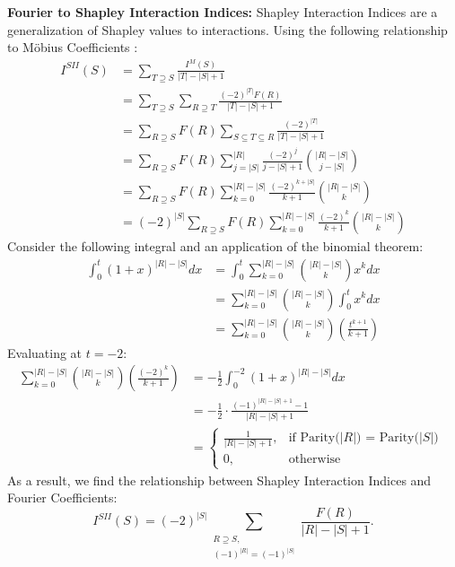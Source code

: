 \textbf{Fourier to Shapley Interaction Indices:}
Shapley Interaction Indices \cite{GRABISCH1997167} are a generalization of Shapley values to interactions. Using the following relationship to M\"obius Coefficients \cite{grabisch2000equivalent}:
\begin{align}
    I^{SII}(S) &= \sum_{T \supseteq S} \frac{I^M(S)}{|T|-|S| + 1}\\
    &= \sum_{T \supseteq S} \sum_{R \supseteq T}\frac{(-2)^{|T|}F(R)}{|T|-|S| + 1}\\
    &= \sum_{R \supseteq S} F(R)\sum_{S \subseteq T \subseteq R}\frac{(-2)^{|T|}}{|T|-|S| + 1}\\
    &= \sum_{R \supseteq S} F(R)\sum_{j = |S|}^{|R|}\frac{(-2)^{j}}{j-|S| + 1 }\binom{|R| - |S|}{j - |S|}\\
    &= \sum_{R \supseteq S} F(R)\sum_{k=0}^{|R|-|S|}\frac{(-2)^{k+|S|}}{k + 1}\binom{|R| - |S|}{k}\\
    &= (-2)^{|S|}\sum_{R \supseteq S} F(R)\sum_{k=0}^{|R|-|S|}\frac{(-2)^{k}}{k + 1}\binom{|R| - |S|}{k}
\end{align}
Consider the following integral and an application of the binomial theorem:
\begin{align}
    \int_0^t (1+x)^{|R|-|S|}dx &=\int_0^t \sum_{k=0}^{|R|-|S|} \binom{|R| - |S|}{k} x^k  dx\\
    &= \sum_{k=0}^{|R|-|S|} \binom{|R| - |S|}{k} \int_0^t x^k  dx \\
    &= \sum_{k=0}^{|R|-|S|} \binom{|R| - |S|}{k} \left(\frac{t^{k+1}}{k+1}\right)
\end{align}
Evaluating at $t=-2$:
\begin{align}
\sum_{k=0}^{|R|-|S|} \binom{|R| - |S|}{k} \left(\frac{(-2)^{k}}{k+1}\right) &= -\frac{1}{2} \int_0^{-2} (1+x)^{|R|-|S|}dx\\
&= -\frac{1}{2}\cdot \frac{(-1)^{|R|-|S|+1}-1}{|R|-|S|+1}\\
&= \begin{cases}
			\frac{1}{|R|-|S|+1}, & \text{if Parity($|R|$) = Parity($|S|$) }\\
            0, & \text{otherwise}
		 \end{cases}
\end{align}
As a result, we find the relationship between Shapley Interaction Indices and Fourier Coefficients:
\begin{equation}
I^{SII}(S) = (-2)^{|S|}\sum_{\substack{R \supseteq S, \\ (-1)^{|R|} = (-1)^{|S|}}} \frac{F(R)}{|R|-|S|+1}.
\end{equation}

